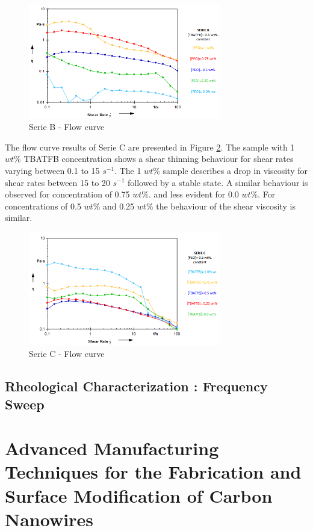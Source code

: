 \begin{figure}[th]
\centering
\includegraphics[width=0.75\textwidth]{./Figures/SerieBflowCurve.png}
\decoRule
\caption[Serie B - Flow curve]{Serie B - Flow curve}
\label{fig:SerieBflowCurve}
\end{figure}

The flow curve results of Serie C are presented in Figure \ref{fig:SerieCflowCurve}. The sample with 1 $w t \%$ TBATFB concentration shows a shear thinning behaviour for shear rates varying between 0.1 to 15 $s^{-1}$. The 1 $w t \%$ sample describes a drop in viscosity for shear rates between 15 to 20 $s^{-1}$ followed by a stable state. A similar behaviour is observed for concentration of 0.75 $w t \%$. and less evident for 0.0 $w t \%$. For concentrations of 0.5 $w t \%$ and 0.25 $w t \%$ the behaviour of the shear viscosity is similar.

\begin{figure}[th]
\centering
\includegraphics[width=0.75\textwidth]{./Figures/SerieCflowCurve.png}
\decoRule
\caption[Serie C - Flow curve]{Serie C - Flow curve}
\label{fig:SerieCflowCurve}
\end{figure}

\subsection{Rheological Characterization : \textbf{Frequency Sweep}}



\clearpage

\section{Advanced Manufacturing Techniques for the Fabrication and Surface Modification of Carbon Nanowires \cite{Cardenas2017}}




